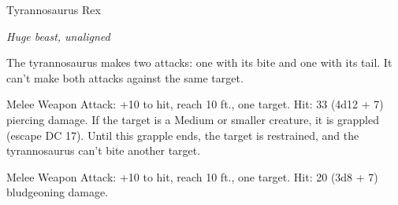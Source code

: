 \begin{monsterbox}{Tyrannosaurus Rex}
\begin{hangingpar}
\textit{Huge beast, unaligned}
\end{hangingpar}
\dndline%
\basics[%
armorclass = 13,
hitpoints = 13d12 + 52,
speed = {50 ft.}
]
\dndline%
\stats[%
STR = \stat{25},
DEX = \stat{10},
CON = \stat{19},
INT = \stat{2},
WIS = \stat{12},
CHA = \stat{9}
]
\dndline%
\details[%
skills={Perception +4, },
damageimmunities={},
savingthrows={},
conditionimmunities={},
damageresistances={},
damagevulnerabilities={},
senses={passive Perception 14},
challenge=8
]
\dndline%
\begin{monsteraction}[Multiattack]
The tyrannosaurus makes two attacks: one with its bite and one with its tail. It can't make both attacks against the same target.
\end{monsteraction}
\begin{monsteraction}[Bite]
Melee Weapon Attack: +10 to hit, reach 10 ft., one target. Hit: 33 (4d12 + 7) piercing damage. If the target is a Medium or smaller creature, it is grappled (escape DC 17). Until this grapple ends, the target is restrained, and the tyrannosaurus can't bite another target.
\end{monsteraction}
\begin{monsteraction}[Tail]
Melee Weapon Attack: +10 to hit, reach 10 ft., one target. Hit: 20 (3d8 + 7) bludgeoning damage.
\end{monsteraction}
\end{monsterbox}